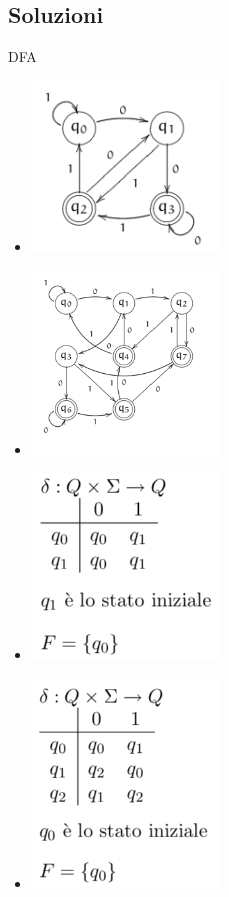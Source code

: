 \documentclass[a4paper,11pt]{article}
\begin{document}
    \subsection{Soluzioni}
    DFA
    \begin{itemize}
        \item \begin{minipage}{\linewidth}
            \centering
            \includegraphics[width=5cm]{SolDFA1.png}
        \end{minipage}
        \item \begin{minipage}{\linewidth}
            \centering
            \includegraphics[width=5cm]{SolDFA2.png}
        \end{minipage}
        \item \begin{minipage}{\linewidth}
            \centering
            \includegraphics[width=5cm]{SolDFA4.png}
        \end{minipage}
        \item \begin{minipage}{\linewidth}
            \centering
            \includegraphics[width=5cm]{SolDFA3.png}
        \end{minipage}
    \end{itemize}
\end{document}
